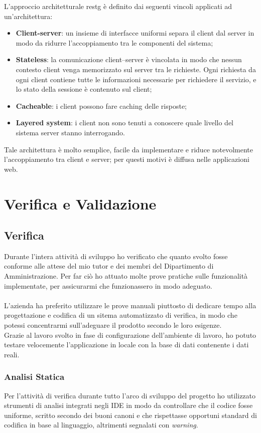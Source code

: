 L’approccio architetturale  \gls{restg} è definito dai seguenti vincoli applicati ad un’architettura:
\begin{itemize}
\item \textbf{Client-server}: un insieme di interfacce uniformi separa il client dal server in
modo da ridurre l’accoppiamento tra le componenti del sistema;
 \item \textbf{Stateless}: la comunicazione client–server è vincolata in modo
che nessun contesto client venga memorizzato sul server tra le richieste. Ogni
richiesta da ogni client contiene tutte le informazioni necessarie per richiedere il
servizio, e lo stato della sessione è contenuto sul client;
\item \textbf{Cacheable}: i client possono fare caching delle risposte;
\item \textbf{Layered system}: i client non sono tenuti a conoscere quale livello del sistema
server stanno interrogando.
\end{itemize}
Tale architettura è molto semplice, facile da implementare e riduce notevolmente l’accoppiamento tra client e server;
per questi motivi è diffusa nelle applicazioni web.

\section{Verifica e Validazione}

	\subsection{Verifica}
	Durante l’intera attività di sviluppo ho verificato che quanto svolto fosse conforme alle
	attese del mio tutor e dei membri del Dipartimento di Amministrazione. Per far ciò ho attuato molte prove pratiche sulle
	funzionalità implementate, per assicurarmi che funzionassero in modo adeguato. \\ \\
	L’azienda ha preferito utilizzare le prove manuali piuttosto di dedicare tempo alla progettazione e codifica di un sitema automatizzato di verifica,
	in modo che potessi concentrarmi sull’adeguare il prodotto secondo le loro esigenze. \\ 
	Grazie al lavoro svolto in fase di configurazione dell’ambiente di lavoro, ho potuto
	testare velocemente l’applicazione in locale con la base di dati contenente i dati reali.
	
	\subsubsection{Analisi Statica}
	Per l’attività di verifica durante tutto l’arco di sviluppo del progetto ho utilizzato strumenti di analisi
	integrati negli IDE in modo da controllare che il codice fosse uniforme, scritto secondo dei
	buoni canoni e che rispettasse opportuni standard di codifica in base al linguaggio, altrimenti segnalati con \emph{warning}.
	
